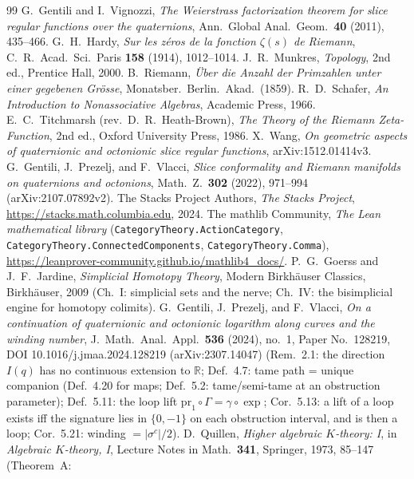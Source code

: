 \documentclass[11pt]{article}
\newcommand{\RR}{\mathbb{R}}
\theoremstyle{plain}
\theoremstyle{definition}
\theoremstyle{remark}
\begin{document}
\begin{thebibliography}{99}
 G.~Gentili and I.~Vignozzi, \emph{The Weierstrass factorization theorem
for slice regular functions over the quaternions}, Ann.\ Global Anal.\ Geom.\
\textbf{40} (2011), 435--466.
 G.~H.~Hardy, \emph{Sur les z\'eros de la fonction $\zeta(s)$ de
Riemann}, C.\ R.\ Acad.\ Sci.\ Paris \textbf{158} (1914), 1012--1014.
\bibitem{Munkres00} J.~R.~Munkres, \emph{Topology}, 2nd ed., Prentice Hall, 2000.
\bibitem{Riemann1859} B.~Riemann, \emph{\"Uber die Anzahl der Primzahlen unter einer
gegebenen Gr\"osse}, Monatsber.\ Berlin.\ Akad.\ (1859).
 R.~D.~Schafer, \emph{An Introduction to Nonassociative Algebras},
Academic Press, 1966.
 E.~C.~Titchmarsh (rev.\ D.~R.~Heath-Brown), \emph{The Theory of
the Riemann Zeta-Function}, 2nd ed., Oxford University Press, 1986.
\bibitem{Wang} X.~Wang, \emph{On geometric aspects of quaternionic and octonionic
slice regular functions}, arXiv:1512.01414v3.
 G.~Gentili, J.~Prezelj, and F.~Vlacci, \emph{Slice conformality and
Riemann manifolds on quaternions and octonions}, Math.\ Z.\ \textbf{302} (2022),
971--994 (arXiv:2107.07892v2).
 The Stacks Project Authors, \emph{The Stacks Project},
\url{https://stacks.math.columbia.edu}, 2024.
 The mathlib Community, \emph{The Lean mathematical library}
(\texttt{CategoryTheory.ActionCategory}, \texttt{CategoryTheory.ConnectedComponents}, \texttt{CategoryTheory.Comma}),
\url{https://leanprover-community.github.io/mathlib4_docs/}.
 P.~G.~Goerss and J.~F.~Jardine, \emph{Simplicial Homotopy Theory}, Modern
Birkh\"auser Classics, Birkh\"auser, 2009 (Ch.~I: simplicial sets and the nerve; Ch.~IV: the
bisimplicial engine for homotopy colimits).
 G.~Gentili, J.~Prezelj, and F.~Vlacci, \emph{On a continuation of
quaternionic and octonionic logarithm along curves and the winding number},
J.~Math.\ Anal.\ Appl.\ \textbf{536} (2024), no.~1, Paper No.~128219,
DOI 10.1016/j.jmaa.2024.128219 (arXiv:2307.14047) (Rem.~2.1: the direction $I(q)$ has no
continuous extension to $\RR$; Def.~4.7: tame path = unique companion (Def.~4.20 for maps;
Def.~5.2: tame/semi-tame at an obstruction parameter); Def.~5.11: the loop lift
$\mathrm{pr}_1\circ\Gamma=\gamma\circ\exp$; Cor.~5.13: a lift of a loop exists iff the
signature lies in $\{0,-1\}$ on each obstruction interval, and is then a loop; Cor.~5.21:
winding $=|\sigma^c|/2$).
 D.~Quillen, \emph{Higher algebraic $K$-theory: I}, in \emph{Algebraic
$K$-theory, I}, Lecture Notes in Math.\ \textbf{341}, Springer, 1973, 85--147 (Theorem~A:

\end{thebibliography}
\end{document}
